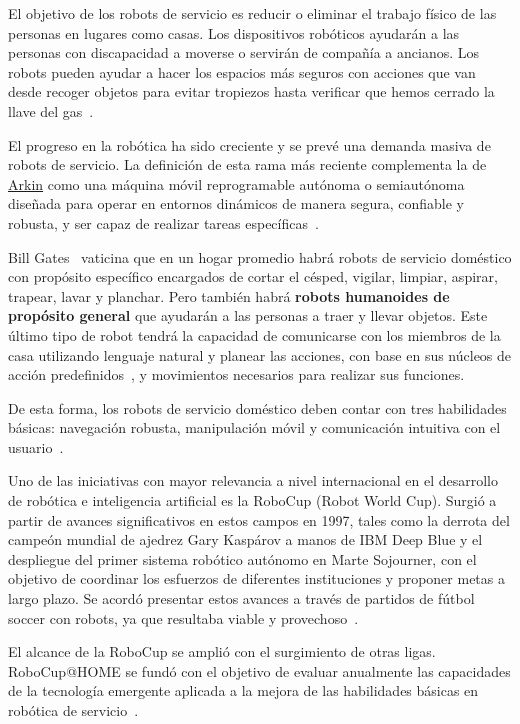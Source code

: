 El objetivo de los robots de servicio es reducir o eliminar el trabajo físico de las personas en lugares como casas. Los dispositivos robóticos ayudarán a las personas con discapacidad a moverse o servirán de compañía a ancianos. Los robots pueden ayudar a hacer los espacios más seguros con acciones que van desde recoger objetos para evitar tropiezos hasta verificar que hemos cerrado la llave del gas~\cite{yazmin_robotsServicio}.

El progreso en la robótica ha sido creciente y se prevé una demanda masiva de robots de servicio. La  definición de esta rama más reciente complementa la de \hyperlink{arkin}{Arkin} como una máquina móvil reprogramable autónoma o semiautónoma diseñada para operar en entornos dinámicos de manera segura, confiable y robusta, y ser capaz de realizar tareas específicas~\cite{yazmin_robotsServicio}.

Bill Gates~\cite{gates_article} vaticina que en un hogar promedio habrá robots de servicio doméstico con propósito específico encargados de cortar el césped, vigilar, limpiar, aspirar, trapear, lavar y planchar. Pero también habrá \textbf{robots humanoides de propósito general} que ayudarán a las personas a traer y llevar objetos. Este último tipo de robot tendrá la capacidad de comunicarse con los miembros de la casa utilizando lenguaje natural y planear las acciones, con base en sus núcleos de acción predefinidos~\cite{yazmin_robotsServicio}, y movimientos necesarios para realizar sus funciones.

De esta forma, los robots de servicio doméstico deben contar con tres habilidades básicas: navegación robusta,   manipulación móvil y comunicación intuitiva con el usuario~\cite{nimbro_manipulation}.

Uno de las iniciativas con mayor relevancia a nivel internacional en el desarrollo de robótica e inteligencia artificial es la RoboCup (Robot World Cup). Surgió a partir de avances significativos en estos campos en 1997, tales como la derrota del campeón mundial de ajedrez Gary Kaspárov a manos de IBM Deep Blue y el despliegue del primer sistema robótico autónomo en Marte Sojourner, con el objetivo de coordinar los esfuerzos de diferentes instituciones y proponer metas a largo plazo. Se acordó presentar estos avances a través de partidos de fútbol soccer con robots, ya que resultaba viable y provechoso~\cite{robocup_history}.

El alcance de la RoboCup se amplió con el surgimiento de otras ligas. RoboCup@HOME se fundó con el objetivo de evaluar anualmente las capacidades de la tecnología emergente aplicada a la mejora de las habilidades básicas en robótica de servicio~\cite{robocup_athome}.

